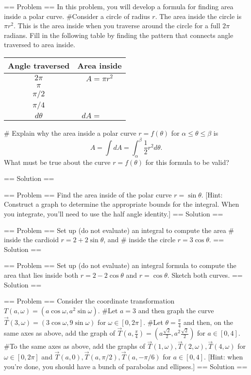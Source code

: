 == Problem ==
In this problem, you will develop a formula for finding area inside a polar curve.
#Consider a circle of radius \(r\). The area inside the circle is \(\pi r^2\). This is the area inside when you traverse around the circle for a full \(2\pi\) radians.  Fill in the following table by finding the pattern that connects angle traversed to area inside.
\begin{center}
\begin{tabular}{c|c}
Angle traversed& Area inside\\ \hline
\(2\pi\) & \(A=\pi r^2\)\\
\(\pi\) & \\
\(\pi/2\) & \\
\(\pi/4\) & \\
\(d\theta\) & \(dA=\quad\quad\)
\end{tabular}
\end{center}
# Explain why the area inside a polar curve \(r=f(\theta)\) for \(\alpha\leq \theta\leq \beta\) is \[A = \int dA = \int_\alpha^\beta \frac{1}{2}r^2d\theta.\] What must be true about the curve \(r=f(\theta)\) for this formula to be valid?

== Solution ==

== Problem ==
Find the area inside of the polar curve \(r=\sin\theta\). [Hint: Construct a graph to determine the appropriate bounds for the integral. When you integrate, you'll need to use the half angle identity.] 
== Solution ==


== Problem ==
Set up (do not evaluate) an integral to compute the area 
# inside the cardioid \(r=2+2\sin\theta\), and 
# inside the circle \(r=3\cos\theta\).
== Solution ==

== Problem ==
Set up (do not evaluate) an integral formula to compute the area that lies inside both \(r=2-2\cos\theta\) and \(r=\cos\theta\). Sketch both curves. 
== Solution ==

== Problem ==
Consider the coordinate transformation \(T(a,\omega)=(a\cos\omega,a^2\sin \omega)\).
#Let \(a=3\) and then graph the curve \(\vec T(3,\omega)=(3\cos\omega,9\sin\omega)\) for \(\omega\in[0,2\pi]\).
#Let \(\theta=\frac{\pi}{4}\) and then, on the same axes as above, add the graph of \(\vec T\left(a,\frac{\pi}{4}\right)=\left(a\frac{\sqrt 2}{2},a^2 \frac{\sqrt 2}{2}\right)\) for \(a\in[0,4]\).
#To the same axes as above, add the graphs of \(\vec T(1,\omega), \vec T(2,\omega), \vec T(4,\omega)\)  for \(\omega\in[0,2\pi]\) and \(\vec T(a,0), \vec T(a,\pi/2), \vec T(a,-\pi/6)\) for \(a\in[0,4]\). 
[Hint: when you're done, you should have a bunch of parabolas and ellipses.]
== Solution ==


